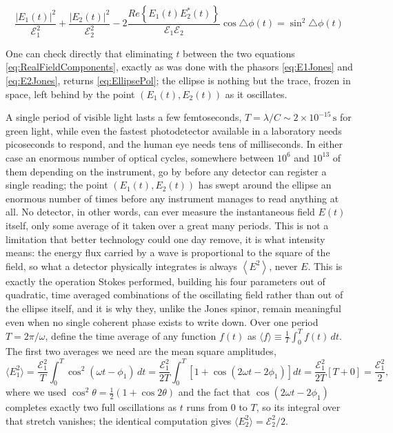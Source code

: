         \begin{equation}\label{eq:EllipsePolTime}
            \frac{|E_1(t)|^2}{\mathcal{E}_1^2} + \frac{|E_2(t)|^2}{\mathcal{E}_2^2} - 2\frac{Re\left\{E_1(t)E_2^*(t)\right\}}{\mathcal{E}_1\mathcal{E}_2}\cos\triangle\phi(t) = \sin^2\triangle\phi(t)
        \end{equation}
        
        One can check directly that eliminating $t$ between the two equations \ref{eq:RealFieldComponents}, exactly as was done with the phasors \ref{eq:E1Jones} and \ref{eq:E2Jones}, returns \ref{eq:EllipsePol}; the ellipse is nothing but the trace, frozen in space, left behind by the point $\left(E_1(t),E_2(t)\right)$ as it oscillates.

        A single period of visible light lasts a few femtoseconds, $T=\lambda/C\sim2\times10^{-15}\,\mathrm{s}$ for green light, while even the fastest photodetector available in a laboratory needs picoseconds to respond, and the human eye needs tens of milliseconds. In either case an enormous number of optical cycles, somewhere between $10^{6}$ and $10^{13}$ of them depending on the instrument, go by before any detector can register a single reading; the point $\left(E_1(t),E_2(t)\right)$ has swept around the ellipse an enormous number of times before any instrument manages to read anything at all. No detector, in other words, can ever measure the instantaneous field $E(t)$ itself, only some average of it taken over a great many periods. This is not a limitation that better technology could one day remove, it is what intensity means: the energy flux carried by a wave is proportional to the square of the field, so what a detector physically integrates is always $\left\langle E^2\right\rangle$, never $E$. This is exactly the operation Stokes performed, building his four parameters out of quadratic, time averaged combinations of the oscillating field rather than out of the ellipse itself, and it is why they, unlike the Jones spinor, remain meaningful even when no single coherent phase exists to write down.
        Over one period $T=2\pi/\omega$, define the time average of any function $f(t)$ as $\langle f\rangle\equiv\frac1T\int_0^T f(t)\,dt$. The first two averages we need are the mean square amplitudes,
        \begin{equation*}
            \langle E_1^2\rangle = \frac{\mathcal E_1^2}{T}\int_0^T\cos^2(\omega t-\phi_1)\,dt = \frac{\mathcal E_1^2}{2T}\int_0^T\left[1+\cos(2\omega t-2\phi_1)\right]dt = \frac{\mathcal E_1^2}{2T}\left[T+0\right] = \frac{\mathcal E_1^2}{2},
        \end{equation*}
        where we used $\cos^2\theta=\frac12(1+\cos2\theta)$ and the fact that $\cos(2\omega t-2\phi_1)$ completes exactly two full oscillations as $t$ runs from $0$ to $T$, so its integral over that stretch vanishes; the identical computation gives $\langle E_2^2\rangle=\mathcal E_2^2/2$.

